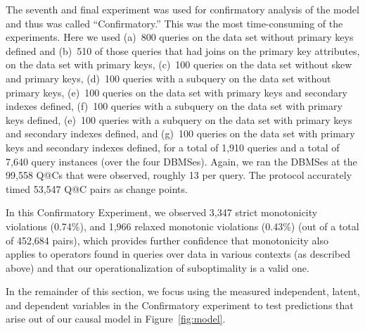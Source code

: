 \documentclass[prodmode,acmtods]{acmsmall}
\makeatletter
\def\QatC{Q{@}C}
\makeatother
\begin{document}
The seventh and final experiment was used for confirmatory analysis of the model and thus was
called ``Confirmatory.'' This was the most time-consuming of
the experiments. Here we
used (a)~800 queries on the data set without primary keys defined and (b)~510 of
those queries that had joins on the primary key attributes, on the data set
with primary keys, 
(c)~100 queries on the data set without skew and primary keys,  
(d)~100 queries with a subquery on the data set without primary keys,  
(e)~100 queries on the data set with primary keys and secondary indexes defined, 
(f)~100 queries with a subquery on the data set with primary keys defined,  
(e)~100 queries with a subquery on the data set with primary keys and secondary indexes defined, and 
(g)~100 queries on the data set with primary keys and secondary indexes defined, 
for a total of 1,910 queries and a total of 7,640 query instances (over the
four DBMSes).
Again, we ran the \hbox{DBMSes} at the 99,558 {\QatC}s that were observed, roughly 13 per query.
The protocol accurately timed 53,547
{\QatC} pairs as change points.\

In this Confirmatory Experiment, we observed 3,347 strict
monotonicity violations (0.74\%), and 1,966 relaxed monotonic violations
(0.43\%) (out of a total of 452,684 pairs), which
provides further confidence that monotonicity also applies to
operators found in queries over data in various contexts (as described above) 
and that our operationalization of suboptimality is a valid one.

In the remainder of this section, we focus using the measured independent,
latent, and dependent variables in the Confirmatory experiment
to test predictions that arise out of our causal model in Figure~\ref{fig:model}.
\end{document}
